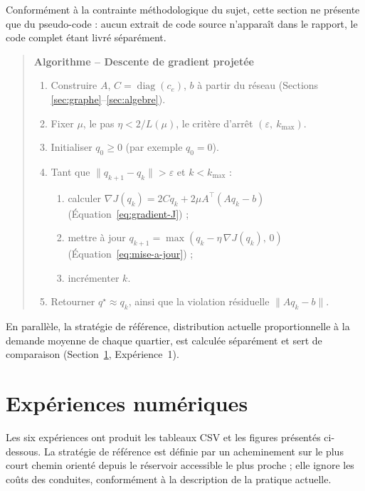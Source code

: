 \documentclass[11pt]{ama-article}
\begin{document}
Conformément à la contrainte méthodologique du sujet, cette section ne présente que du
pseudo-code : aucun extrait de code source n'apparaît dans le rapport, le code complet étant
livré séparément.

\begin{quote}
\textbf{Algorithme -- Descente de gradient projetée}
\begin{enumerate}[label=\arabic*.]
    \item Construire $A$, $C=\operatorname{diag}(c_e)$, $b$ à partir du réseau (Sections
    \ref{sec:graphe}--\ref{sec:algebre}).
    \item Fixer $\mu$, le pas $\eta<2/L(\mu)$, le critère d'arrêt $(\varepsilon,\ k_{\max})$.
    \item Initialiser $q_0 \ge 0$ (par exemple $q_0=0$).
    \item Tant que $\|q_{k+1}-q_k\| > \varepsilon$ et $k<k_{\max}$ :
    \begin{enumerate}[label=(\alph*)]
        \item calculer $\nabla J(q_k) = 2Cq_k + 2\mu A^\top(Aq_k-b)$ (Équation~\ref{eq:gradient-J}) ;
        \item mettre à jour $q_{k+1} = \max(q_k - \eta\,\nabla J(q_k),\,0)$ (Équation~\ref{eq:mise-a-jour}) ;
        \item incrémenter $k$.
    \end{enumerate}
    \item Retourner $q^\star \approx q_k$, ainsi que la violation résiduelle $\|Aq_k-b\|$.
\end{enumerate}
\end{quote}

En parallèle, la stratégie de référence, distribution actuelle proportionnelle à la demande
moyenne de chaque quartier, est calculée séparément et sert de comparaison
(Section~\ref{sec:experiences}, Expérience~1).

\section{Expériences numériques}
\label{sec:experiences}

Les six expériences ont produit les tableaux CSV et les figures présentés ci-dessous. La
stratégie de référence est définie par un acheminement sur le plus court chemin orienté depuis
le réservoir accessible le plus proche ; elle ignore les coûts des conduites, conformément à
la description de la pratique actuelle.
\end{document}
